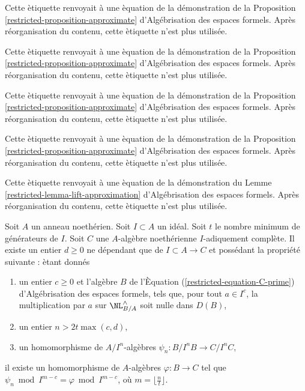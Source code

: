 \begin{remark}
\label{remark-equation-derivatives}
Cette \`etiquette renvoyait \`a une \`equation de la d\'emonstration de
la Proposition \ref{restricted-proposition-approximate}
d'Alg\'ebrisation des espaces formels.
Apr\`es r\'eorganisation du contenu, cette \`etiquette n'est plus utilis\'ee.
\end{remark}

\begin{remark}
\label{remark-equation-ci}
Cette \`etiquette renvoyait \`a une \`equation de la d\'emonstration de
la Proposition \ref{restricted-proposition-approximate}
d'Alg\'ebrisation des espaces formels.
Apr\`es r\'eorganisation du contenu, cette \`etiquette n'est plus utilis\'ee.
\end{remark}

\begin{remark}
\label{remark-equation-in-ideal}
Cette \`etiquette renvoyait \`a une \`equation de la d\'emonstration de
la Proposition \ref{restricted-proposition-approximate}
d'Alg\'ebrisation des espaces formels.
Apr\`es r\'eorganisation du contenu, cette \`etiquette n'est plus utilis\'ee.
\end{remark}

\begin{remark}
\label{remark-equation-derivatives-analogue}
Cette \`etiquette renvoyait \`a une \`equation de la d\'emonstration de
la Proposition \ref{restricted-proposition-approximate}
d'Alg\'ebrisation des espaces formels.
Apr\`es r\'eorganisation du contenu, cette \`etiquette n'est plus utilis\'ee.
\end{remark}

\begin{remark}
\label{remark-equation-go-down}
Cette \`etiquette renvoyait \`a une \`equation de la d\'emonstration du
Lemme \ref{restricted-lemma-lift-approximation}
d'Alg\'ebrisation des espaces formels.
Apr\`es r\'eorganisation du contenu, cette \`etiquette n'est plus utilis\'ee.
\end{remark}

\begin{lemma}
\label{lemma-get-morphism-general}
Soit $A$ un anneau noeth\'erien. Soit $I \subset A$ un id\'eal.
Soit $t$ le nombre minimum de g\'en\'erateurs de $I$.
Soit $C$ une $A$-alg\`ebre noeth\'erienne $I$-adiquement compl\`ete.
Il existe un entier $d \geq 0$ ne d\'ependant que de
$I \subset A \to C$ et poss\'edant la propri\'et\'e suivante : \`etant donn\'es
\begin{enumerate}
\item un entier $c \geq 0$ et l'alg\`ebre $B$ de l'\`Equation
(\ref{restricted-equation-C-prime}) d'Alg\'ebrisation des espaces formels,
tels que, pour tout $a \in I^c$,
la multiplication par $a$ sur $\NL_{B/A}^\wedge$ soit nulle dans $D(B)$,
\item un entier $n > 2t\max(c, d)$,
\item un homomorphisme de $A/I^n$-alg\`ebres
$\psi_n : B/I^nB \to C/I^nC$,
\end{enumerate}
il existe un homomorphisme de $A$-alg\`ebres $\varphi : B \to C$ tel
que $\psi_n \bmod I^{m - c} = \varphi \bmod I^{m - c}$,
o\`u $m = \lfloor \frac{n}{t} \rfloor$.
\end{lemma}

